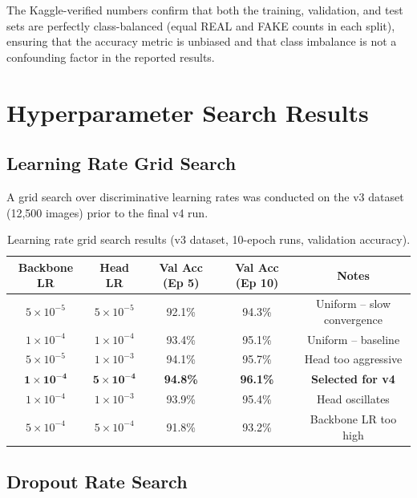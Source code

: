 \documentclass[12pt,a4paper,oneside]{report}
\begin{document}
The Kaggle-verified numbers confirm that both the training, validation, and
test sets are perfectly class-balanced (equal REAL and FAKE counts in each split),
ensuring that the accuracy metric is unbiased and that class imbalance is not a
confounding factor in the reported results.

\chapter{Hyperparameter Search Results}
\label{app:hparam}

\section{Learning Rate Grid Search}

A grid search over discriminative learning rates was conducted on the v3 dataset
(12,500 images) prior to the final v4 run.

\begin{table}[H]
\centering
\caption{Learning rate grid search results (v3 dataset, 10-epoch runs, validation accuracy).}
\label{tab:lr_grid}
\renewcommand{\arraystretch}{1.3}
\begin{tabular}{ccccc}
\toprule
\textbf{Backbone LR} & \textbf{Head LR} & \textbf{Val Acc (Ep 5)} &
\textbf{Val Acc (Ep 10)} & \textbf{Notes} \\
\midrule
$5\times10^{-5}$ & $5\times10^{-5}$ & 92.1\% & 94.3\% & Uniform -- slow convergence \\
$1\times10^{-4}$ & $1\times10^{-4}$ & 93.4\% & 95.1\% & Uniform -- baseline \\
$5\times10^{-5}$ & $1\times10^{-3}$ & 94.1\% & 95.7\% & Head too aggressive \\
$\mathbf{1\times10^{-4}}$ & $\mathbf{5\times10^{-4}}$ & \textbf{94.8\%} & \textbf{96.1\%} & \textbf{Selected for v4} \\
$1\times10^{-4}$ & $1\times10^{-3}$ & 93.9\% & 95.4\% & Head oscillates \\
$5\times10^{-4}$ & $5\times10^{-4}$ & 91.8\% & 93.2\% & Backbone LR too high \\
\bottomrule
\end{tabular}
\end{table}

\section{Dropout Rate Search}
\end{document}
